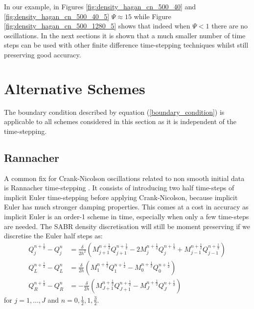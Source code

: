 \documentclass[]{rAMF2e}
\begin{document}
In our example, in Figures \ref{fig:density_hagan_cn_500_40} and \ref{fig:density_hagan_cn_500_40_5} $\Psi \approx 15$ while Figure \ref{fig:density_hagan_cn_500_1280_5} shows that indeed when $\Psi < 1$ there are no oscillations. In the next sections it is shown that a much smaller number of time steps can be used with other finite difference time-stepping techniques whilst still preserving good accuracy.

\section{Alternative Schemes}
The boundary condition described by equation (\ref{boundary_condition}) is applicable to all schemes considered in this section as it is independent of the time-stepping.

\subsection{Rannacher}
A common fix for Crank-Nicolson oscillations related to non smooth initial data is Rannacher time-stepping \citep{rannacher1984finite, GiCa2006}. It consists of introducing two half time-steps of implicit Euler time-stepping before applying Crank-Nicolson, because implicit Euler has much stronger damping properties. This comes at a cost in accuracy as implicit Euler is an order-1 scheme in time, especially when only a few time-steps are needed. 
The SABR density discretisation will still be moment preserving if we discretise the Euler half steps as:
\begin{align}\label{eqn_euler_1}
Q_j^{n+\frac{1}{2}}-Q_j^n &= \frac{\delta}{2h^2} \left(M_{j+1}^{n+\frac{1}{2}}Q_{j+1}^{n+\frac{1}{2}}-2M_j^{n+\frac{1}{2}}Q_j^{n+\frac{1}{2}}+M_{j-1}^{n+\frac{1}{2}}Q_{j-1}^{n+\frac{1}{2}} \right) \\
\label{eqn_euler_2}
Q_L^{n+\frac{1}{2}}-Q_L^n &= \frac{\delta}{2h} \left(M_{1}^{n+\frac{1}{2}}Q_{1}^{n+\frac{1}{2}}-M_0^{n+\frac{1}{2}}Q_0^{n+\frac{1}{2}}\right) \\
Q_R^{n+\frac{1}{2}}-Q_R^n &= -\frac{\delta}{2h} \left(M_{J+1}^{n+\frac{1}{2}}Q_{J+1}^{n+\frac{1}{2}}-M_J^{n+\frac{1}{2}}Q_J^{n+\frac{1}{2}}\right) 
\end{align}
for $j=1,...,J$ and $n=0,\frac{1}{2}, 1, \frac{3}{2}$.
\end{document}
